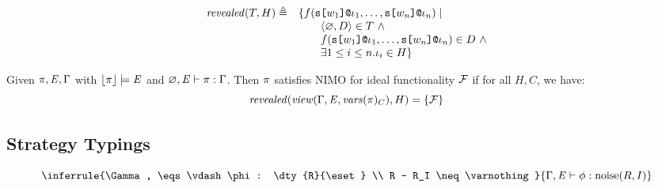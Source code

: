 \begin{definition}[Revelation]
  $$
  \begin{array}{ll}
    \mathit{revealed}(T,H) \triangleq & \{ f(\texttt{s[}w_1\texttt{]}\texttt{@}\iota_1,\ldots,\texttt{s[}w_n\texttt{]}\texttt{@}\iota_n) \mid  \\
      & \qquad \langle \varnothing, D \rangle \in T\ \wedge\\
      & \qquad f(\texttt{s[}w_1\texttt{]}\texttt{@}\iota_1,\ldots,\texttt{s[}w_n\texttt{]}\texttt{@}\iota_n) \in D\ \wedge \\
      & \qquad \exists 1 \le i \le n . \iota_i \in H \} 
  \end{array}
  $$
\end{definition}

\begin{theorem}
  Given $\pi, \mathit{E}, \Gamma$ with $\lfloor \pi \rfloor \models \mathit{E}$ and $\varnothing, \mathit{E} \vdash \pi : \Gamma$.
  Then $\pi$ satisfies {NIMO} for ideal functionality $\mathcal{F}$ if for all $H,C$, we have:
  $$
  \mathit{revealed}(\mathit{view}(\Gamma,\mathit{E},\mathit{vars}(\pi)_C),H) = \{ \mathcal{F} \}
  $$
\end{theorem}

\subsection{Strategy Typings}

$$
\inferrule
    {\Gamma, \eqs \vdash \phi : \dty{R}{\eset} \\ R - R_I \neq \varnothing}
    {\Gamma, \eqs \vdash \phi : \noise(R,I)}
$$

